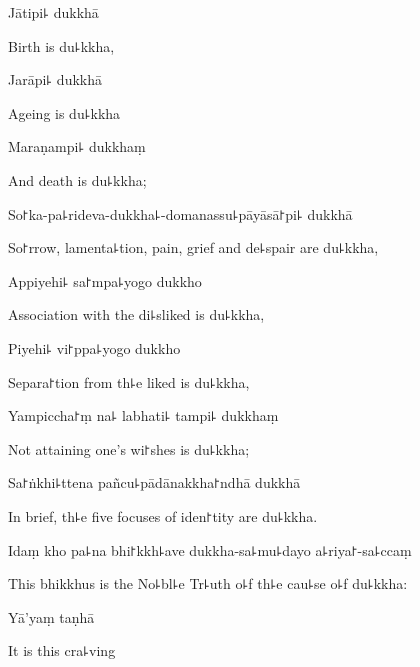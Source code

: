 Jātipi꜕ dukkhā

\begin{english}
  Birth is du꜕kkha,
\end{english}

Jarāpi꜕ dukkhā

\begin{english}
  Ageing is du꜕kkha
\end{english}

Maraṇampi꜕ dukkhaṃ

\begin{english}
  And death is du꜕kkha;
\end{english}

So꜓ka-pa꜕rideva-dukkha꜕-domanassu꜕pāyāsā꜓pi꜕ dukkhā

\begin{english}
  So꜓rrow, lamenta꜕tion, pain, grief and de꜕spair are du꜕kkha,
\end{english}

Appiyehi꜕ sa꜓mpa꜕yogo dukkho

\begin{english}
  Association with the di꜕sliked is du꜕kkha,
\end{english}

Piyehi꜕ vi꜓ppa꜕yogo dukkho

\begin{english}
  Separa꜓tion from th꜕e liked is du꜕kkha,
\end{english}

Yampiccha꜓ṃ na꜕ labhati꜕ tampi꜕ dukkhaṃ

\begin{english}
  Not attaining one's wi꜓shes is du꜕kkha;
\end{english}

Sa꜓ṅkhi꜕ttena pañcu꜕pādānakkha꜓ndhā dukkhā

\begin{english}
  In brief, th꜕e five focuses of iden꜓tity are du꜕kkha.
\end{english}

Idaṃ kho pa꜕na bhi꜓kkh꜕ave dukkha-sa꜕mu꜕dayo a꜕riya꜓-sa꜕ccaṃ

\begin{english}
  This bhikkhus is the No꜕bl꜕e Tr꜕uth o꜕f th꜕e cau꜕se o꜕f du꜕kkha:
\end{english}

Yā'yaṃ taṇhā

\begin{english}
  It is this cra꜕ving
\end{english}

